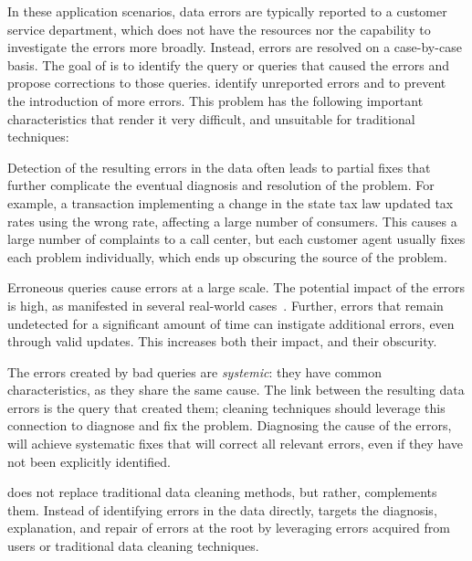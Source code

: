 In these application scenarios, data errors are typically reported to
a customer service department, which does not have the resources nor
the capability to investigate the errors more broadly. Instead, errors
are resolved on a case-by-case basis. The goal of \sys is to identify
the query or queries that caused the errors and propose corrections to
those queries.   identify unreported
errors and to prevent the introduction of more errors. This problem
has the following important characteristics that render it very difficult, and unsuitable for traditional
techniques:


\begin{description}[leftmargin=*, topsep=0mm, itemsep=0mm]
    
    \item[Obscurity.] Detection of the resulting errors in the data often
    leads to partial fixes that further complicate the eventual diagnosis and
    resolution of the problem. For example, a transaction implementing a
    change in the state tax law updated tax rates using the wrong rate,
    affecting a large number of consumers. This causes a large number of
    complaints to a call center, but each customer agent usually fixes each
    problem individually, which ends up obscuring the source of the problem.
    
    \item[Large impact.] Erroneous queries cause errors at a large scale. The
    potential impact of the errors is high, as manifested in several
    real-world cases~\cite{Yates10, Grady13, sakalerrors}. Further, errors
    that remain undetected for a significant amount of time can instigate
    additional errors, even through valid updates. This increases both their
    impact, and their obscurity.
    
    \item[Systemic errors.] The errors created by bad queries are
    \emph{systemic}: they have common characteristics, as they share the same
    cause. The link between the resulting data errors is the query that
    created them; cleaning techniques should leverage this connection to
    diagnose and fix the problem. Diagnosing the cause of the errors, will
    achieve systematic fixes that will correct all relevant errors, even if
    they have not been explicitly identified.
    
\end{description}
% 
\sys does not replace traditional data cleaning methods, but rather, complements them.
Instead of identifying errors in the data directly, 
\sys targets the diagnosis, explanation, and repair of errors at the root by
leveraging errors acquired from 
users or traditional data cleaning techniques.

